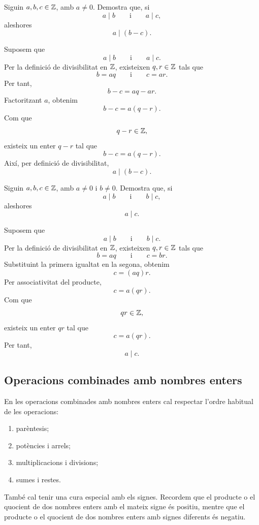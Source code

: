 \begin{exercici}
Siguin $a,b,c\in\mathbb{Z}$, amb $a\neq 0$. Demostra que, si
\[
a\mid b
\qquad\text{i}\qquad
a\mid c,
\]
aleshores
\[
a\mid (b-c).
\]
\end{exercici}

\begin{solucio}
Suposem que
\[
a\mid b
\qquad\text{i}\qquad
a\mid c.
\]
Per la definició de divisibilitat en $\mathbb{Z}$, existeixen $q,r\in\mathbb{Z}$ tals que
\[
b=aq
\qquad\text{i}\qquad
c=ar.
\]
Per tant,
\[
b-c=aq-ar.
\]
Factoritzant $a$, obtenim
\[
b-c=a(q-r).
\]
Com que
\[
q-r\in\mathbb{Z},
\]
existeix un enter $q-r$ tal que
\[
b-c=a(q-r).
\]
Així, per definició de divisibilitat,
\[
a\mid (b-c).
\]
\end{solucio}


\begin{exercici}
Siguin $a,b,c\in\mathbb{Z}$, amb $a\neq 0$ i $b\neq 0$. Demostra que, si
\[
a\mid b
\qquad\text{i}\qquad
b\mid c,
\]
aleshores
\[
a\mid c.
\]
\end{exercici}

\begin{solucio}
Suposem que
\[
a\mid b
\qquad\text{i}\qquad
b\mid c.
\]
Per la definició de divisibilitat en $\mathbb{Z}$, existeixen $q,r\in\mathbb{Z}$ tals que
\[
b=aq
\qquad\text{i}\qquad
c=br.
\]
Substituint la primera igualtat en la segona, obtenim
\[
c=(aq)r.
\]
Per associativitat del producte,
\[
c=a(qr).
\]
Com que
\[
qr\in\mathbb{Z},
\]
existeix un enter $qr$ tal que
\[
c=a(qr).
\]
Per tant,
\[
a\mid c.
\]
\end{solucio}

\subsection{Operacions combinades amb nombres enters}

En les operacions combinades amb nombres enters cal respectar l'ordre habitual de les operacions:
\begin{enumerate}
	\item parèntesis;
	\item potències i arrels;
	\item multiplicacions i divisions;
	\item sumes i restes.
\end{enumerate}
També cal tenir una cura especial amb els signes. Recordem que el producte o el quocient de dos nombres enters amb el mateix signe és positiu, mentre que el producte o el quocient de dos nombres enters amb signes diferents és negatiu.

